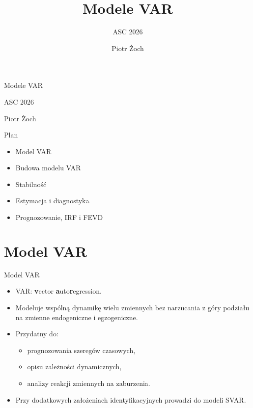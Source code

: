 \documentclass[11pt,aspectratio=169,xcolor=dvipsnames]{beamer}
\title{Modele VAR}
\subtitle{ASC 2026}
\author{Piotr Żoch}
\date{}
\begin{document}
\begin{frame}[plain]
  \vspace{1.2cm}
  {Modele VAR\par}
  \vspace{0.35cm}
  {ASC 2026\par}
  \vspace{0.9cm}
  {Piotr Żoch\par}
\end{frame}

\begin{frame}{Plan}
  \begin{itemize}
    \item Model VAR
    \item Budowa modelu VAR
    \item Stabilność
    \item Estymacja i diagnostyka
    \item Prognozowanie, IRF i FEVD
  \end{itemize}
\end{frame}

\section{Model VAR}

\begin{frame}{Model VAR}
  \begin{itemize}
    \item VAR: \textbf{v}ector \textbf{a}uto\textbf{r}egression.
    \item Modeluje wspólną dynamikę wielu zmiennych bez narzucania z góry podziału na zmienne endogeniczne i egzogeniczne.
    \item Przydatny do:
      \begin{itemize}
        \item prognozowania szeregów czasowych,
        \item opisu zależności dynamicznych,
        \item analizy reakcji zmiennych na zaburzenia.
      \end{itemize}
    \item Przy dodatkowych założeniach identyfikacyjnych prowadzi do modeli SVAR.
  \end{itemize}
\end{frame}
\end{document}
